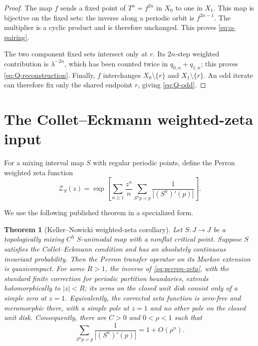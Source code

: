 \documentclass[11pt]{article}
\newtheorem{theorem}{Theorem}[section]
\theoremstyle{definition}
\theoremstyle{remark}
\newcommand{\cZ}{\mathcal Z}
\begin{document}
\begin{proof}
The map $f$ sends a fixed point of $T^n=f^{2n}$ in $X_0$ to one in $X_1$.
This map is bijective on the fixed sets: the inverse along a periodic orbit is
$f^{2n-1}$.  The multiplier is a cyclic product and is therefore unchanged.
This proves \eqref{eq:q-pairing}.

The two component fixed sets intersect only at $r$.  Its $2n$-step weighted
contribution is $\lambda^{-2n}$, which has been counted twice in
$q_{0,n}+q_{1,n}$; this proves \eqref{eq:Q-reconstruction}.  Finally, $f$
interchanges $X_0\setminus\{r\}$ and $X_1\setminus\{r\}$.  An odd iterate can
therefore fix only the shared endpoint $r$, giving \eqref{eq:Q-odd}.
\end{proof}

\section{The Collet--Eckmann weighted-zeta input}
\label{sec:zeta-input}

For a mixing interval map $S$ with regular periodic points, define the Perron
weighted zeta function
\begin{equation}\label{eq:perron-zeta}
 \cZ_S(z)
 =\exp\left[
 \sum_{n\ge1}\frac{z^n}{n}
 \sum_{S^n p=p}\frac1{|(S^n)'(p)|}
 \right].
\end{equation}

We use the following published theorem in a specialized form.

\begin{theorem}[Keller--Nowicki weighted-zeta corollary]
\label{thm:KN}
Let $S:J\to J$ be a topologically mixing $C^3$ $S$-unimodal map with a
nonflat critical point.  Suppose $S$ satisfies the Collet--Eckmann condition
and has an absolutely continuous invariant probability.  Then the Perron
transfer operator on its Markov extension is quasicompact.  For some $R>1$,
the inverse of \eqref{eq:perron-zeta}, with the standard finite correction for
periodic partition boundaries, extends holomorphically to $|z|<R$; its zeros
on the closed unit disk consist only of a simple zero at $z=1$.  Equivalently,
the corrected zeta function is zero-free and meromorphic there, with a simple
pole at $z=1$ and no other pole on the closed unit disk.  Consequently, there
are $C>0$ and $0<\rho<1$ such that
\begin{equation}\label{eq:KN-coefficients}
 \sum_{S^n p=p}\frac1{|(S^n)'(p)|}
 =1+O(\rho^n).
\end{equation}
\end{theorem}
\end{document}
